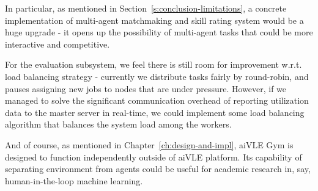 In particular, as mentioned in Section~\ref{s:conclusion-limitations}, a concrete implementation of multi-agent matchmaking and skill rating system would be a huge upgrade - it opens up the possibility of multi-agent tasks that could be more interactive and competitive.

For the evaluation subsystem, we feel there is still room for improvement w.r.t. load balancing strategy - currently we distribute tasks fairly by round-robin, and pauses assigning new jobs to nodes that are under pressure. However, if we managed to solve the significant communication overhead of reporting utilization data to the master server in real-time, we could implement some load balancing algorithm that balances the system load among the workers.

And of course, as mentioned in Chapter~\ref{ch:design-and-impl}, aiVLE Gym is designed to function independently outside of aiVLE platform. Its capability of separating environment from agents could be useful for academic research in, say, human-in-the-loop machine learning.
